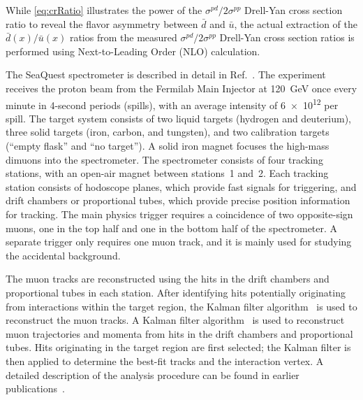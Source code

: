 \documentclass[reprint,aps,unsortedaddress,superscriptaddress,prl,floatfix,showpacs,linenumbers]{revtex4-2}
\begin{document}
While \cref{eq:crRatio} illustrates the power of the $\sigma^{pd}/2\sigma^{pp}$ Drell-Yan cross section
ratio to reveal the flavor asymmetry between $\bar{d}$ and $\bar{u}$,
the actual extraction of the $\bar{d}\left(x\right) / \bar{u}\left(x\right)$
ratios from the measured $\sigma^{pd}/ 2 \sigma^{pp}$ Drell-Yan cross
section ratios is performed using Next-to-Leading Order (NLO)
calculation.

The SeaQuest spectrometer is described in detail in Ref.~\cite{aidala2019}.
The experiment receives the proton beam from the Fermilab Main
Injector at \SI{120}{\GeV}
once every minute in 4-second periods (spills), with an average intensity
of \num{6e12} per spill.
The target system consists of two liquid targets (hydrogen and deuterium),
three solid targets (iron, carbon, and tungsten), and two calibration
targets (``empty flask'' and ``no target'').
A solid iron magnet focuses the high-mass dimuons into the spectrometer.
The spectrometer consists of four tracking stations, with an open-air magnet between stations~1 and~2.
Each tracking station consists of hodoscope planes, which
provide fast signals for triggering,
and drift chambers or proportional tubes, which provide precise
position information for tracking.
The main physics trigger requires a coincidence of two opposite-sign muons,
one in the top half and one in the bottom half of the spectrometer.
A separate trigger only requires one muon track, and it is mainly used
for studying the accidental background.

The muon tracks are reconstructed using the hits in the drift chambers and proportional tubes in each station.
After identifying hits potentially originating from interactions within the target region,
the Kalman filter algorithm~\cite{kalman1960} is used to reconstruct the muon tracks.
A Kalman filter algorithm~\cite{kalman1960} is used to reconstruct muon trajectories and momenta from hits in the drift chambers and proportional tubes.
Hits originating in the target region are first selected; the Kalman filter is then applied to determine the best-fit tracks and the interaction vertex.
A detailed description of the analysis procedure can be found in earlier publications~\cite{dove2021,dove2023}.
\end{document}
